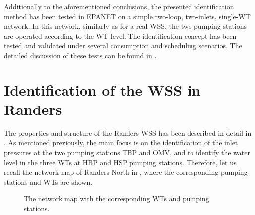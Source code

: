 Additionally to the aforementioned conclusions, the presented identification method has been tested in EPANET on a simple two-loop, two-inlets, single-WT network. In this network, similarly as for a real WSS, the two pumping stations are operated according to the WT level. The identification concept has been tested and validated under several consumption and scheduling scenarios. The detailed discussion of these tests can be found in . 



\newpage

\section{Identification of the WSS in Randers}
\label{identification_of_the_randers_WSS} 

The properties and structure of the Randers WSS has been described in detail in . As mentioned previously, the main focus is on the identification of the inlet pressures at the two pumping stations TBP and OMV, and to identify the water level in the three WTs at HBP and HSP pumping stations. Therefore, let us recall the network map of Randers North in , where the corresponding pumping stations and WTs are shown.  

\begin{figure}[H]
\centering

\caption{The network map with the corresponding WTs and pumping stations.}
\label{fig:simplified_network_identification1223}
\end{figure}
\vspace{-3mm}

